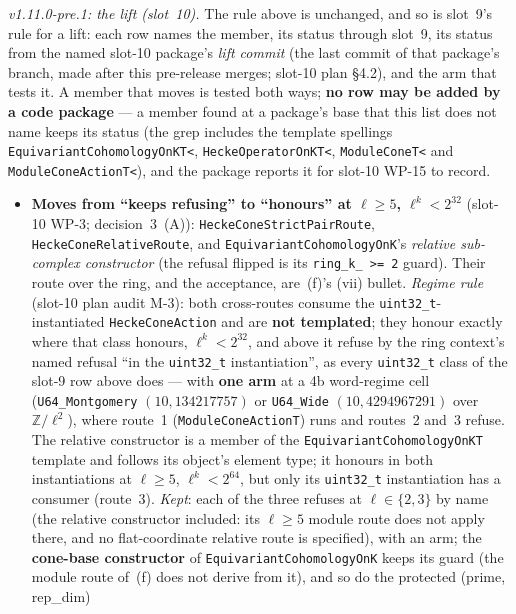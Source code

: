 \documentclass[11pt]{article}
\theoremstyle{remark}
\newcommand{\Z}{\mathbb{Z}}
\begin{document}
\begin{enumerate}[label=(b\arabic*)]
  \begingroup\sloppy
  \emph{v1.11.0-pre.1: the lift (slot~10).} The rule above is unchanged, and so is slot~9's rule
  for a lift: each row names the member, its status through slot~9, its status from the named
  slot-10 package's \emph{lift commit} (the last commit of that package's branch, made after this
  pre-release merges; slot-10 plan \S4.2), and the arm that tests it. A member that moves is tested
  both ways; \textbf{no row may be added by a code package} --- a member found at a package's base
  that this list does not name keeps its status (the grep includes the template spellings
  \texttt{EquivariantCohomologyOnKT<}, \texttt{HeckeOperatorOnKT<}, \texttt{ModuleConeT<} and \texttt{ModuleConeActionT<}),
  and the package reports it for slot-10 WP-15 to record.
  \begin{itemize}
  \item \textbf{Moves from ``keeps refusing'' to ``honours'' at $\ell\ge5$, $\ell^k<2^{32}$}
    (slot-10 WP-3; decision~3~(A)): \texttt{HeckeConeStrictPairRoute},
    \texttt{HeckeConeRelativeRoute}, and \texttt{EquivariantCohomologyOnK}'s \emph{relative
    sub-complex constructor} (the refusal flipped is its \texttt{ring\_k\_ >= 2} guard). Their
    route over the ring, and the acceptance, are~(f)'s (vii) bullet. \emph{Regime rule} (slot-10
    plan audit M-3): both cross-routes consume the \texttt{uint32\_t}-instantiated
    \texttt{HeckeConeAction} and are \textbf{not templated}; they honour exactly where that class
    honours, $\ell^k<2^{32}$, and above it refuse by the ring context's named refusal ``in the
    \texttt{uint32\_t} instantiation'', as every \texttt{uint32\_t} class of the slot-9 row above
    does --- with \textbf{one arm} at a 4b word-regime cell (\texttt{U64\_Montgomery}
    $(10,134217757)$ or \texttt{U64\_Wide} $(10,4294967291)$ over $\Z/\ell^2$), where route~1
    (\texttt{ModuleConeActionT}) runs and routes~2 and~3 refuse. The relative constructor is a
    member of the \texttt{EquivariantCohomologyOnKT} template and follows its object's element
    type; it honours in both instantiations at $\ell\ge5$, $\ell^k<2^{64}$, but only its
    \texttt{uint32\_t} instantiation has a consumer (route~3). \emph{Kept}: each of the three
    refuses at $\ell\in\{2,3\}$ by name (the relative constructor included: its $\ell\ge5$ module
    route does not apply there, and no flat-coordinate relative route is specified), with an arm;
    the \textbf{cone-base constructor} of \texttt{EquivariantCohomologyOnK} keeps its guard (the
    module route of~(f) does not derive from it), and so do the protected (prime, rep\_dim)

\end{itemize}
\end{enumerate}
\end{document}
